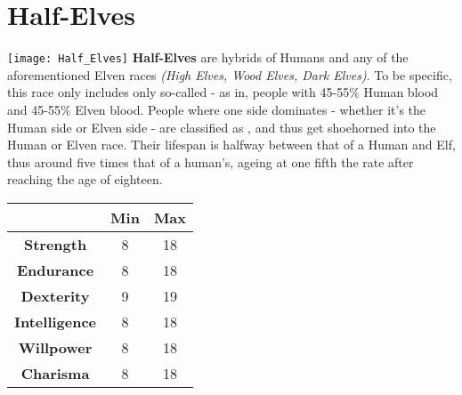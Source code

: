 \documentclass[openany,10pt,a4paper]{book}
\begin{document}
\section{Half-Elves}
\texttt{[image: Half\_Elves]}\newline
\textbf{Half-Elves} are hybrids of Humans and any of the aforementioned Elven races \textit{(High Elves, Wood Elves, Dark Elves)}. To be specific, this race only includes only so-called  - as in, people with 45-55\% Human blood and 45-55\% Elven blood. People where one side dominates - whether it's the Human side or Elven side - are classified as , and thus get shoehorned into the Human or Elven race. Their lifespan is halfway between that of a Human and Elf, thus around five times that of a human's, ageing at one fifth the rate after reaching the age of eighteen.\newline
\begin{tabular}{|c|c|c|}
\hline
 & \textbf{Min} & \textbf{Max} \\ \hline
\textbf{Strength} & 8 & 18 \\ \hline
\textbf{Endurance} & 8 & 18 \\ \hline
\textbf{Dexterity} & 9 & 19 \\ \hline
\textbf{Intelligence} & 8 & 18 \\ \hline
\textbf{Willpower} & 8 & 18 \\ \hline
\textbf{Charisma} & 8 & 18 \\ \hline
\end{tabular}\newline
{} \newpage
\end{document}
